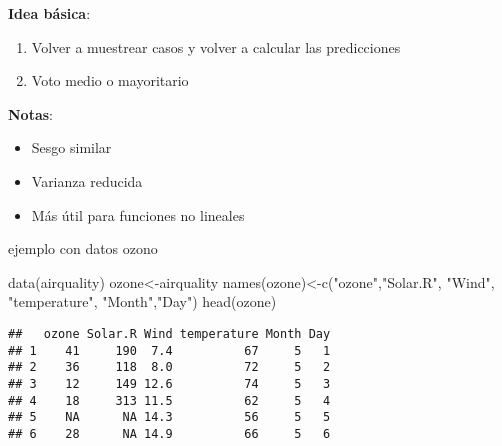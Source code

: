 \documentclass[
]{article}
\newenvironment{Shaded}{\begin{snugshade}}{\end{snugshade}}
\newcommand{\FunctionTok}[1]{\textcolor[rgb]{0.00,0.00,0.00}{#1}}
\newcommand{\NormalTok}[1]{#1}
\newcommand{\OtherTok}[1]{\textcolor[rgb]{0.56,0.35,0.01}{#1}}
\newcommand{\StringTok}[1]{\textcolor[rgb]{0.31,0.60,0.02}{#1}}
\providecommand{\tightlist}{%
  \setlength{\itemsep}{0pt}\setlength{\parskip}{0pt}}
\begin{document}
\textbf{Idea básica}:

\begin{enumerate}
\def\labelenumi{\arabic{enumi}.}
\tightlist
\item
  Volver a muestrear casos y volver a calcular las predicciones
\item
  Voto medio o mayoritario
\end{enumerate}

\textbf{Notas}:

\begin{itemize}
\tightlist
\item
  Sesgo similar
\item
  Varianza reducida
\item
  Más útil para funciones no lineales
\end{itemize}

ejemplo con datos ozono

\begin{Shaded}
\begin{Highlighting}[]
\FunctionTok{data}\NormalTok{(airquality)}
\NormalTok{ozone}\OtherTok{\textless{}{-}}\NormalTok{airquality}
\FunctionTok{names}\NormalTok{(ozone)}\OtherTok{\textless{}{-}}\FunctionTok{c}\NormalTok{(}\StringTok{"ozone"}\NormalTok{,}\StringTok{"Solar.R"}\NormalTok{, }\StringTok{"Wind"}\NormalTok{, }\StringTok{"temperature"}\NormalTok{, }\StringTok{"Month"}\NormalTok{,}\StringTok{"Day"}\NormalTok{)}
\FunctionTok{head}\NormalTok{(ozone)}
\end{Highlighting}
\end{Shaded}

\begin{verbatim}
##   ozone Solar.R Wind temperature Month Day
## 1    41     190  7.4          67     5   1
## 2    36     118  8.0          72     5   2
## 3    12     149 12.6          74     5   3
## 4    18     313 11.5          62     5   4
## 5    NA      NA 14.3          56     5   5
## 6    28      NA 14.9          66     5   6
\end{verbatim}
\end{document}
